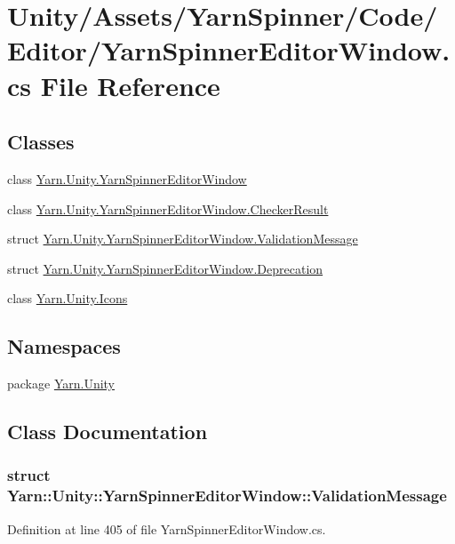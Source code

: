 \hypertarget{a00273}{\section{Unity/\-Assets/\-Yarn\-Spinner/\-Code/\-Editor/\-Yarn\-Spinner\-Editor\-Window.cs File Reference}
\label{a00273}
}
\subsection*{Classes}
\begin{DoxyCompactItemize}
\item 
class \hyperlink{a00166}{Yarn.\-Unity.\-Yarn\-Spinner\-Editor\-Window}
\item 
class \hyperlink{a00049}{Yarn.\-Unity.\-Yarn\-Spinner\-Editor\-Window.\-Checker\-Result}
\item 
struct \hyperlink{a00166_a00358}{Yarn.\-Unity.\-Yarn\-Spinner\-Editor\-Window.\-Validation\-Message}
\item 
struct \hyperlink{a00088}{Yarn.\-Unity.\-Yarn\-Spinner\-Editor\-Window.\-Deprecation}
\item 
class \hyperlink{a00108}{Yarn.\-Unity.\-Icons}
\end{DoxyCompactItemize}
\subsection*{Namespaces}
\begin{DoxyCompactItemize}
\item 
package \hyperlink{a00129}{Yarn.\-Unity}
\end{DoxyCompactItemize}


\subsection{Class Documentation}
\label{a00358}
\hypertarget{a00166_a00358}{}
\subsubsection{struct Yarn\-:\-:Unity\-:\-:Yarn\-Spinner\-Editor\-Window\-:\-:Validation\-Message}


Definition at line 405 of file Yarn\-Spinner\-Editor\-Window.\-cs.



